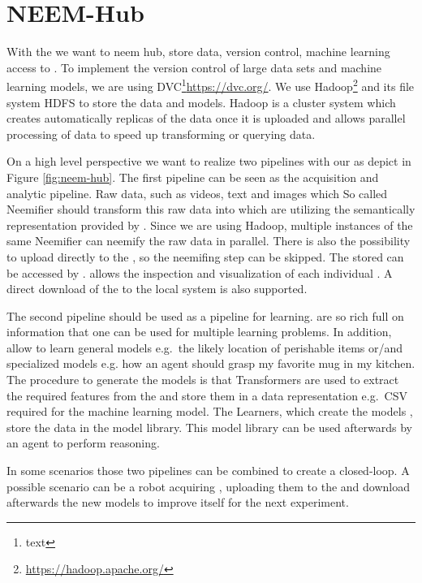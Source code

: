\chapter{NEEM-Hub}
\label{ch:neemhub}


With the \neemhub we want to 
neem hub, store data, version control, machine learning access to \openease. 
To implement the version control of large data sets and machine learning models, we are using DVC\footnote{text}\url{https://dvc.org/}. 
We use Hadoop\footnote{\url{https://hadoop.apache.org/}} and its file system HDFS to store the data and models.
Hadoop is a cluster system which creates automatically replicas of the data once it is uploaded and allows parallel processing of data to speed up transforming or querying data.

On a high level perspective we want to realize two pipelines with our \neemhub as depict in Figure \ref{fig:neem-hub}. 
The first pipeline can be seen as the acquisition and analytic pipeline.
Raw data, such as videos, text and images which 
So called Neemifier should transform this raw data into \neems which are utilizing the semantically representation provided by \soma.
Since we are using Hadoop, multiple instances of the same Neemifier can neemify the raw data in parallel. 
There is also the possibility to upload \neems directly to the \neemhub, so the neemifing step can be skipped.
The stored \neems can be accessed by \openease. \openease allows the inspection and visualization of each individual \neem.
A direct download of the \neems to the local system is also supported.

The second pipeline should be used as a pipeline for learning.
\neems are so rich full on information that one \neem can be used for multiple learning problems.
In addition, \neems allow to learn general models e.g.\ the likely location of perishable items or/and specialized models e.g. how an agent should grasp my favorite mug in my kitchen.
The procedure to generate the models is that Transformers are used to extract the required features from the \neems and store them in a data representation e.g.\ CSV required for the machine learning model.
The Learners, which create the models , store the data in the model library. 
This model library can be used afterwards by an agent to perform reasoning.

In some scenarios those two pipelines can be combined to create a closed-loop. A possible scenario can be a robot acquiring \neems, uploading them to the \neemhub and download afterwards the new models to improve itself for the next experiment. 


